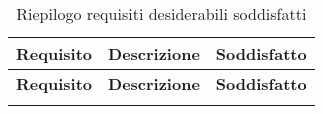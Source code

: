 \def\arraystretch{1.5}
\begin{longtable}{p{2cm}!{\VRule[1pt]}p{6cm}!{\VRule[1pt]}p{2cm}!{\VRule[1pt]}}
\color{white} \textbf{Requisito} & \color{white} \textbf{Descrizione} & \color{white} \textbf{Soddisfatto} \\ 
\endfirsthead 
{} 
\color{white} \textbf{Requisito} & \color{white} \textbf{Descrizione} & \color{white} \textbf{Soddisfatto} \\ 
\endhead 
{}
\caption{Riepilogo requisiti desiderabili soddisfatti}
\end{longtable}
